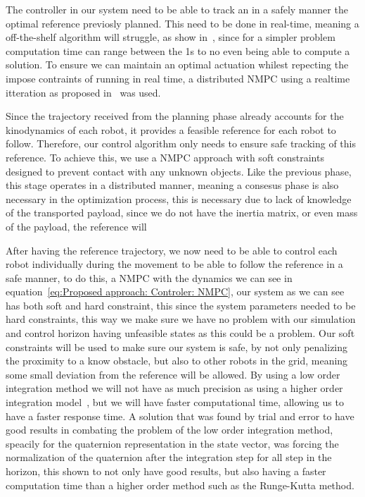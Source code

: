 The controller in our system need to be able to track an in a safely manner the optimal reference previosly planned. This need to be done in real-time, meaning a off-the-shelf algorithm will struggle, as show in~\cite{7400956}, since for a simpler problem computation time can range between the 1s to no even being able to compute a solution. To ensure we can maintain an optimal actuation whilest repecting the impose contraints of running in real time, a distributed NMPC using a realtime itteration as proposed in~\cite{diehl2002real} was used. 

Since the trajectory received from the planning phase already accounts for the kinodynamics of each robot, it provides a feasible reference for each robot to follow. Therefore, our control algorithm only needs to ensure safe tracking of this reference. To achieve this, we use a NMPC approach with soft constraints designed to prevent contact with any unknown objects. Like the previous phase, this stage operates in a distributed manner, meaning a consesus phase is also necessary in the optimization process, this is necessary due to lack of knowledge of the transported payload, since we do not have the inertia matrix, or even mass of the payload, the reference will 

After having the reference trajectory, we now need to be able to control each robot individually during the movement to be able to follow the reference in a safe manner, to do this, a NMPC with the dynamics we can see in equation~\ref{eq:Proposed approach: Controler: NMPC}, our system as we can see has both soft and hard constraint, this since the system parameters needed to be hard constraints, this way we make sure we have no problem with our simulation and control horizon having unfeasible states as this could be a problem. Our soft constraints will be used to make sure our system is safe, by not only penalizing the proximity to a know obstacle, but also to other robots in the grid, meaning some small deviation from the reference will be allowed.  By using a low order integration method we will not have as much precision as using a higher order integration model~\cite{gros2020linear}, but we will have faster computational time, allowing us to have a faster response time. A solution that was found by trial and error to have good results in combating the problem of the low order integration method, speacily for the quaternion representation in the state vector, was forcing the normalization of the quaternion after the integration step for all step in the horizon, this shown to not only have good results, but also having a faster computation time than a higher order method such as the Runge-Kutta method.



